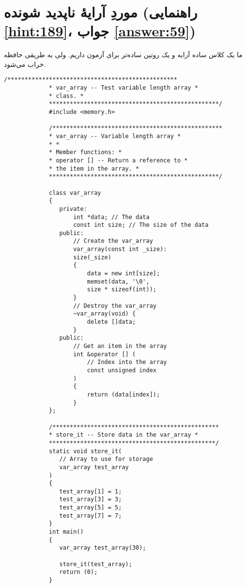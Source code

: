 \section[موردِ آرایهٔ ناپدید شونده]{موردِ آرایهٔ ناپدید شونده \protect{} (راهنمایی \ref{hint:189}، جواب \ref{answer:59})}
\paragraph{}\label{prog:82}
ما یک کلاس ساده آرایه و یک روتین ساده‌تر برای آزمون داریم. ولی به طریقی حافظه خراب می‌شود.

\begin{LTR}
        \begin{lstlisting}[style=C++Style]
             /*************************************************
             * var_array -- Test variable length array *
             * class. *
             *************************************************/
             #include <memory.h>

             /*************************************************
             * var_array -- Variable length array *
             * *
             * Member functions: *
             * operator [] -- Return a reference to *
             * the item in the array. *
             *************************************************/

             class var_array
             {
             	private:
             		int *data; // The data
             		const int size; // The size of the data
             	public:
             		// Create the var_array
             		var_array(const int _size):
             		size(_size)
             		{
             			data = new int[size];
             			memset(data, '\0',
             			size * sizeof(int));
             		}
             		// Destroy the var_array
             		~var_array(void) {
             			delete []data;
             		}
             	public:
             		// Get an item in the array
             		int &operator [] (
             			// Index into the array
             			const unsigned index
             		)
             		{
             			return (data[index]);
             		}
             };

             /************************************************
             * store_it -- Store data in the var_array *
             ************************************************/
             static void store_it(
             	// Array to use for storage
             	var_array test_array
             )
             {
             	test_array[1] = 1;
             	test_array[3] = 3;
             	test_array[5] = 5;
             	test_array[7] = 7;
             }
             int main()
             {
             	var_array test_array(30);

             	store_it(test_array);
             	return (0);
             }
        \end{lstlisting}
\end{LTR}


